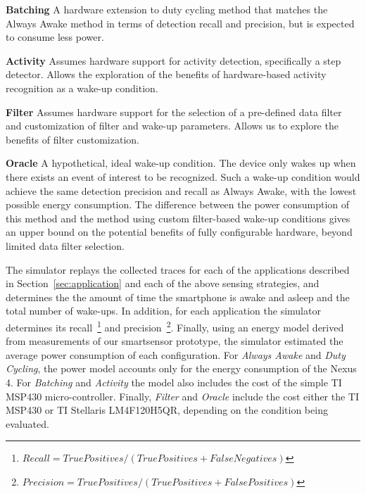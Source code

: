 \textbf{Batching} A hardware extension to duty
  cycling method that matches the Always Awake method in terms of
  detection recall and precision, but is expected to consume less
  power.

\textbf{Activity} Assumes hardware support for
  activity detection, specifically a step detector.  Allows the
  exploration of the benefits of hardware-based activity recognition
  as a wake-up condition.

\textbf{Filter} Assumes hardware
  support for the selection of a pre-defined data filter and
  customization of filter and wake-up parameters. Allows us to explore
  the benefits of filter customization.

\textbf{Oracle} A hypothetical, ideal wake-up condition. The
  device only wakes up when there exists an event of interest to be
  recognized. Such a wake-up condition would achieve the same
  detection precision and recall as Always Awake, with the lowest
  possible energy consumption. The difference between the power
  consumption of this method and the method using custom filter-based
  wake-up conditions gives an upper bound on the potential benefits of
  fully configurable hardware, beyond limited data filter selection.

  The simulator replays the collected traces for each of the
  applications described in Section~\ref{sec:application} and each of
  the above sensing strategies, and determines the the amount of time
  the smartphone is awake and asleep and the total number of wake-ups.
  In addition, for each application the simulator determines its
  recall~\footnote{$Recall=TruePositives/(TruePositives+FalseNegatives)$}
  and
  precision~\footnote{$Precision=TruePositives/(TruePositives+FalsePositives)$}. Finally, using an energy model derived from measurements of our
  smartsensor prototype, the simulator estimated the average power
  consumption of each configuration.  For {\em Always Awake} and {\em
    Duty Cycling}, the power model accounts only for the energy
  consumption of the Nexus 4.  For {\em Batching} and {\em Activity}
  the model also includes the cost of the simple TI MSP430
  micro-controller.  Finally, {\em Filter} and {\em Oracle} include
  the cost either the TI MSP430 or TI Stellaris LM4F120H5QR, depending
  on the condition being evaluated.








